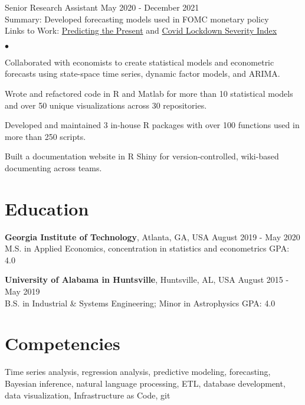 \documentclass[margin, line]{res}
\newenvironment{list2}{
  \begin{list}{$\bullet$}{%
      \setlength{\itemsep}{0.04in}
      \setlength{\parsep}{0in} \setlength{\parskip}{0in}
      \setlength{\topsep}{0.05in} \setlength{\partopsep}{0in} 
      \setlength{\leftmargin}{\dimexpr 26pt-0.05in}}}
    {\end{list}}
\begin{document}
\begin{resume}
Senior Research Assistant \hfill May 2020 - December 2021 \\
\hspace*{3mm}
    Summary: Developed forecasting models used in FOMC monetary policy\\
\hspace*{3mm}
    Links to Work:  \href{https://michaelboerman.medium.com/predicting-the-present-a56ff704af0b}{Predicting the Present} and   \href{https://github.com/michaelboerman/lockdown_severity_index#readme}{Covid Lockdown Severity Index}
    
    \begin{list2}
        \item Collaborated with economists to create statistical models and econometric forecasts using state-space time series, dynamic factor models, and ARIMA.
        \item Wrote and refactored code in R and Matlab for more than 10 statistical models and over 50 unique visualizations across 30 repositories.
        \item Developed and maintained 3 in-house R packages with over 100 functions used in more than 250 scripts.
        \item Built a documentation website in R Shiny for version-controlled, wiki-based documenting across teams.
    \end{list2}


\section{\sc Education }

{\bf Georgia Institute of Technology}, Atlanta, GA, USA \hfill August 2019 - May 2020\\
M.S. in Applied Economics, concentration in statistics and econometrics \hfill GPA: 4.0


{\bf University of Alabama in Huntsville}, Huntsville, AL, USA \hfill August 2015 - May 2019 \\
B.S. in Industrial \& Systems Engineering; Minor in Astrophysics \hfill GPA: 4.0

\section{\sc Competencies} 
Time series analysis, regression analysis, predictive modeling, forecasting, Bayesian inference, natural language processing, ETL, database development, data visualization, Infrastructure as Code, git


\end{resume}
\end{document}
